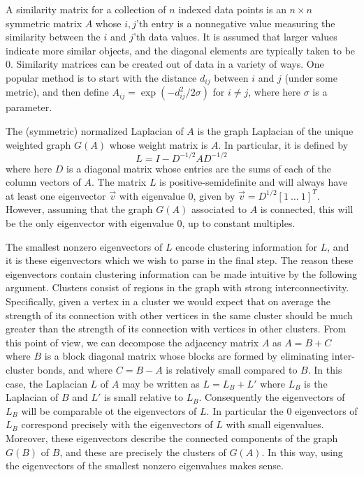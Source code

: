 \documentclass[10pt,journal,compsoc]{IEEEtran} %
\theoremstyle{definition}
\begin{document}
A similarity matrix for a collection of $n$ indexed data points is an
$n\times n$ symmetric matrix $A$ whose $i,j$'th entry is a nonnegative
value measuring the similarity between the $i$ and $j$'th data values.
It is assumed that larger values indicate more similar objects, and
the diagonal elements are typically taken to be $0$.  Similarity
matrices can be created out of data in a variety of ways.  One popular
method is to start with the distance $d_{ij}$ between $i$ and $j$
(under some metric), and then define $A_{ij} =
\exp(-d_{ij}^2/2\sigma)$ for $i\neq j$, where here $\sigma$ is a
parameter.

The (symmetric) normalized Laplacian of $A$ is the graph Laplacian of
the unique weighted graph $G(A)$ whose weight matrix is $A$.  In
particular, it is defined by
$$L = I - D^{-1/2}AD^{-1/2}$$
where here $D$ is a diagonal matrix whose entries are the sums of each
of the column vectors of $A$.  The matrix $L$ is positive-semidefinite
and will always have at least one eigenvector $\vec v$ with eigenvalue
$0$, given by $\vec v = D^{1/2}[1\ \dots\ 1]^T$.  However, assuming
that the graph $G(A)$ associated to $A$ is connected, this will be the
only eigenvector with eigenvalue $0$, up to constant multiples.

The smallest nonzero eigenvectors of $L$ encode clustering information
for $L$, and it is these eigenvectors which we wish to parse in the
final step.  The reason these eigenvectors contain clustering
information can be made intuitive by the following argument.  Clusters
consist of regions in the graph with strong interconnectivity.
Specifically, given a vertex in a cluster we would expect that on
average the strength of its connection with other vertices in the same
cluster should be much greater than the strength of its connection
with vertices in other clusters.  From this point of view, we can
decompose the adjacency matrix $A$ as $A = B+C$ where $B$ is a block
diagonal matrix whose blocks are formed by eliminating inter-cluster
bonds, and where $C=B-A$ is relatively small compared to $B$.  In this
case, the Laplacian $L$ of $A$ may be written as $L=L_B + L'$ where
$L_B$ is the Laplacian of $B$ and $L'$ is small relative to $L_B$.
Consequently the eigenvectors of $L_B$ will be comparable ot the
eigenvectors of $L$.  In particular the $0$ eigenvectors of $L_B$
correspond precisely with the eigenvectors of $L$ with small
eigenvalues.  Moreover, these eigenvectors describe the connected
components of the graph $G(B)$ of $B$, and these are precisely the
clusters of $G(A)$.  In this way, using the eigenvectors of the
smallest nonzero eigenvalues makes sense.
\end{document}
